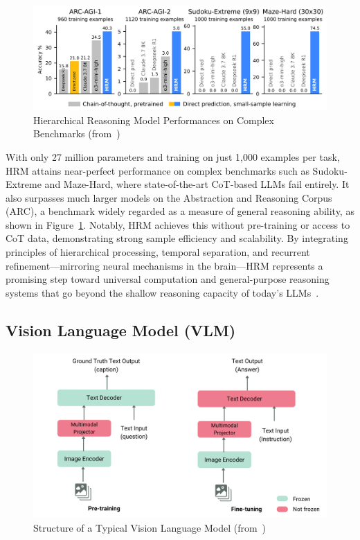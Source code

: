 \documentclass[12pt]{extarticle}
\begin{document}
\begin{figure}[htbp]
    \centering
    \includegraphics[width=0.8\linewidth]{images/hrm-bench.png}
    \caption{Hierarchical Reasoning Model Performances on Complex Benchmarks (from~\cite{hrm})}
    \label{fig:hrm-results}
\end{figure}

With only 27 million parameters and training on just 1,000 examples per task, HRM attains near-perfect performance on complex benchmarks such as Sudoku-Extreme and Maze-Hard, where state-of-the-art CoT-based LLMs fail entirely. It also surpasses much larger models on the Abstraction and Reasoning Corpus (ARC), a benchmark widely regarded as a measure of general reasoning ability, as shown in Figure~\ref{fig:hrm-results}. Notably, HRM achieves this without pre-training or access to CoT data, demonstrating strong sample efficiency and scalability. By integrating principles of hierarchical processing, temporal separation, and recurrent refinement—mirroring neural mechanisms in the brain—HRM represents a promising step toward universal computation and general-purpose reasoning systems that go beyond the shallow reasoning capacity of today’s LLMs~\cite{hrm}.

\subsection{Vision Language Model (VLM)}
\begin{figure}[htbp]
    \centering
    \includegraphics[width=0.8\linewidth]{images/vlm-structure.png}
    \caption{Structure of a Typical Vision Language Model (from~\cite{huggingface_vlms_2024})}
    \label{fig:vlm-structure}
\end{figure}
\end{document}
